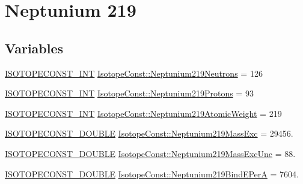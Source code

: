\hypertarget{group___isotope_const-_neptunium-_np219}{}\section{Neptunium 219}
\label{group___isotope_const-_neptunium-_np219}
\subsection*{Variables}
\begin{DoxyCompactItemize}
\item 
\mbox{\hyperlink{group___isotope_const-_macros_ga5f18360b3e99483a35c32d789e62621c}{I\+S\+O\+T\+O\+P\+E\+C\+O\+N\+S\+T\+\_\+\+I\+NT}} \mbox{\hyperlink{group___isotope_const-_neptunium-_np219_ga5a8a2eff75f8453d424e949b83537f37}{Isotope\+Const\+::\+Neptunium219\+Neutrons}} = 126
\item 
\mbox{\hyperlink{group___isotope_const-_macros_ga5f18360b3e99483a35c32d789e62621c}{I\+S\+O\+T\+O\+P\+E\+C\+O\+N\+S\+T\+\_\+\+I\+NT}} \mbox{\hyperlink{group___isotope_const-_neptunium-_np219_gadfcd010bd47354bbeecef89d2db714a3}{Isotope\+Const\+::\+Neptunium219\+Protons}} = 93
\item 
\mbox{\hyperlink{group___isotope_const-_macros_ga5f18360b3e99483a35c32d789e62621c}{I\+S\+O\+T\+O\+P\+E\+C\+O\+N\+S\+T\+\_\+\+I\+NT}} \mbox{\hyperlink{group___isotope_const-_neptunium-_np219_gadfc384d22014f9dadd89eec8d997eef2}{Isotope\+Const\+::\+Neptunium219\+Atomic\+Weight}} = 219
\item 
\mbox{\hyperlink{group___isotope_const-_macros_ga8f45a7272ce02c0b4c65c44636ed719a}{I\+S\+O\+T\+O\+P\+E\+C\+O\+N\+S\+T\+\_\+\+D\+O\+U\+B\+LE}} \mbox{\hyperlink{group___isotope_const-_neptunium-_np219_ga5b69f70512c6e315f49cb27df37c83c9}{Isotope\+Const\+::\+Neptunium219\+Mass\+Exc}} = 29456.
\item 
\mbox{\hyperlink{group___isotope_const-_macros_ga8f45a7272ce02c0b4c65c44636ed719a}{I\+S\+O\+T\+O\+P\+E\+C\+O\+N\+S\+T\+\_\+\+D\+O\+U\+B\+LE}} \mbox{\hyperlink{group___isotope_const-_neptunium-_np219_gacc551811c50e584e65dcef6a7cee3030}{Isotope\+Const\+::\+Neptunium219\+Mass\+Exc\+Unc}} = 88.
\item 
\mbox{\hyperlink{group___isotope_const-_macros_ga8f45a7272ce02c0b4c65c44636ed719a}{I\+S\+O\+T\+O\+P\+E\+C\+O\+N\+S\+T\+\_\+\+D\+O\+U\+B\+LE}} \mbox{\hyperlink{group___isotope_const-_neptunium-_np219_gae045e753e5df7613f63292d0b2cb5e1e}{Isotope\+Const\+::\+Neptunium219\+Bind\+E\+PerA}} = 7604.
\item 

\end{DoxyCompactItemize}
